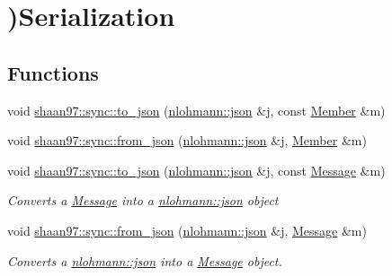 \hypertarget{group___de}{}\section{)Serialization}
\label{group___de}
\subsection*{Functions}
\begin{DoxyCompactItemize}
\item 
void \hyperlink{group___de_gaad90c8bd50725f5382dc2207225f52ee}{shaan97\+::sync\+::to\+\_\+json} (\hyperlink{namespacenlohmann_a2bfd99e845a2e5cd90aeaf1b1431f474}{nlohmann\+::json} \&j, const \hyperlink{classshaan97_1_1sync_1_1_member}{Member} \&m)
\item 
void \hyperlink{group___de_ga35dd3deb42a1ec52e00a2980b5c7c842}{shaan97\+::sync\+::from\+\_\+json} (\hyperlink{namespacenlohmann_a2bfd99e845a2e5cd90aeaf1b1431f474}{nlohmann\+::json} \&j, \hyperlink{classshaan97_1_1sync_1_1_member}{Member} \&m)
\item 
void \hyperlink{group___de_ga213581ca789d5151c699fb4cb30db916}{shaan97\+::sync\+::to\+\_\+json} (\hyperlink{namespacenlohmann_a2bfd99e845a2e5cd90aeaf1b1431f474}{nlohmann\+::json} \&j, const \hyperlink{structshaan97_1_1sync_1_1_message}{Message} \&m)
\begin{DoxyCompactList}\small\item\em Converts a {\ttfamily \hyperlink{structshaan97_1_1sync_1_1_message}{Message}} into a {\ttfamily \hyperlink{namespacenlohmann_a2bfd99e845a2e5cd90aeaf1b1431f474}{nlohmann\+::json} object} \end{DoxyCompactList}\item 
void \hyperlink{group___de_gaba06015bb8b13049b093f0bde8e89377}{shaan97\+::sync\+::from\+\_\+json} (\hyperlink{namespacenlohmann_a2bfd99e845a2e5cd90aeaf1b1431f474}{nlohmann\+::json} \&j, \hyperlink{structshaan97_1_1sync_1_1_message}{Message} \&m)
\begin{DoxyCompactList}\small\item\em Converts a {\ttfamily \hyperlink{namespacenlohmann_a2bfd99e845a2e5cd90aeaf1b1431f474}{nlohmann\+::json}} into a {\ttfamily \hyperlink{structshaan97_1_1sync_1_1_message}{Message}} object. \end{DoxyCompactList}\end{DoxyCompactItemize}
